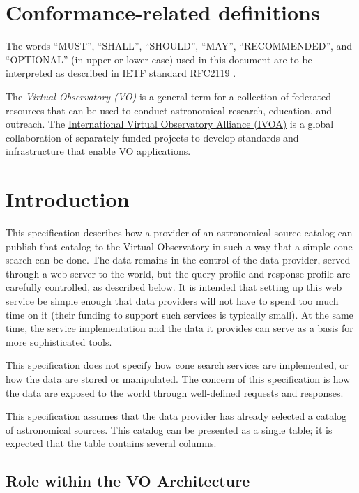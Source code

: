 \documentclass[11pt,a4paper]{ivoa}
\begin{document}
\section*{Conformance-related definitions}

The words ``MUST'', ``SHALL'', ``SHOULD'', ``MAY'', ``RECOMMENDED'', and
``OPTIONAL'' (in upper or lower case) used in this document are to be
interpreted as described in IETF standard RFC2119 \citep{std:RFC2119}.

The \emph{Virtual Observatory (VO)} is a general term for a collection
of federated resources that can be used to conduct astronomical
research, education, and outreach.  The
\href{http://www.ivoa.net}{International Virtual Observatory Alliance
(IVOA)} is a global collaboration of separately funded projects to
develop standards and infrastructure that enable VO applications.


\section{Introduction}

This specification describes how a provider of an astronomical source
catalog can publish that catalog to the Virtual Observatory in such a
way that a simple cone search can be done. The data remains in the
control of the data provider, served through a web server to the world,
but the query profile and response profile are carefully controlled, as
described below. It is intended that setting up this web service be
simple enough that data providers will not have to spend too much time
on it (their funding to support such services is typically small). At
the same time, the service implementation and the data it provides can
serve as a basis for more sophisticated tools.

This specification does not specify how cone search services are
implemented, or how the data are stored or manipulated. The concern of
this specification is how the data are exposed to the world through
well-defined requests and responses.

This specification assumes that the data provider has already selected a
catalog of astronomical sources. This catalog can be presented as a
single table; it is expected that the table contains several columns.

\subsection{Role within the VO Architecture}
\end{document}
